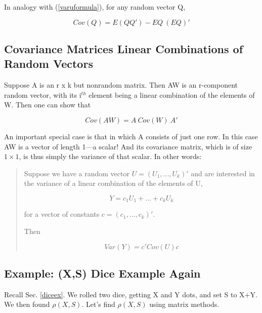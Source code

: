 In analogy with (\ref{varuformula}), for any
random vector Q,

\begin{equation}
\label{quickcovarmat}
Cov(Q) = E(Q Q') - EQ ~ (EQ)'
\end{equation}

\subsection{Covariance Matrices Linear Combinations of Random Vectors}

Suppose A is an r x k but nonrandom matrix.  Then AW is an r-component
random vector, with its i$^{th}$ element being a linear combination of
the elements of W.  Then one can show that

\begin{equation}
\label{covawaprime}
Cov(AW) = A ~ Cov(W)  ~A'
\end{equation}

An important special case is that in which A consists of just one row.
In this case AW is a vector of length 1---a scalar!  And its covariance
matrix, which is of size $1 \times 1$, is thus simply the variance of
that scalar.  In other words:

\begin{quote}

Suppose we have a random vector $U = (U_1,...,U_k)'$ and are interested
in the variance of a linear combination of the elements of U, 

\begin{equation}
\label{quadform1}
Y = c_1 U_1 + ...+ c_k U_k
\end{equation}

for a vector of constants $c = (c_1,...,c_k)'$.

Then

\begin{equation}
\label{quadform2}
Var(Y) =  c'Cov(U) c
\end{equation}

\end{quote}

\subsection{Example: (X,S) Dice Example Again}

Recall Sec. \ref{diceex}.  We rolled two dice, getting X and Y dots, and
set S to X+Y.  We then found $\rho(X,S)$.  Let's find
$\rho(X,S)$ using matrix methods.

